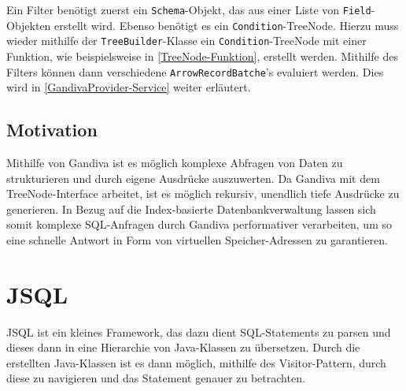 Ein Filter benötigt zuerst ein \texttt{Schema}-Objekt, das aus einer Liste von \texttt{Field}-Objekten erstellt wird. Ebenso benötigt es ein \texttt{Condition}-TreeNode.
Hierzu muss wieder mithilfe der \texttt{TreeBuilder}-Klasse ein \texttt{Condition}-TreeNode mit einer Funktion, wie beispielsweise in \ref{TreeNode-Funktion}, erstellt werden.
Mithilfe des Filters können dann verschiedene \texttt{ArrowRecordBatche}'s evaluiert werden. Dies wird in \ref{GandivaProvider-Service} weiter erläutert.

\subsection{Motivation}

Mithilfe von Gandiva ist es möglich komplexe Abfragen von Daten zu strukturieren und durch eigene Ausdrücke auszuwerten. Da Gandiva mit dem TreeNode-Interface arbeitet, ist es möglich rekursiv, unendlich tiefe Ausdrücke zu generieren. In Bezug auf die Index-basierte Datenbankverwaltung lassen sich somit komplexe SQL-Anfragen durch Gandiva performativer verarbeiten, um so eine schnelle Antwort in Form von virtuellen Speicher-Adressen zu garantieren. 


\section{JSQL}

JSQL ist ein kleines Framework, das dazu dient SQL-Statements zu parsen und dieses dann in eine Hierarchie von Java-Klassen zu übersetzen.
Durch die erstellten Java-Klassen ist es dann möglich, mithilfe des Visitor-Pattern, durch diese zu navigieren und das Statement genauer zu betrachten.\cite{wumpz:JSQLParser} 
